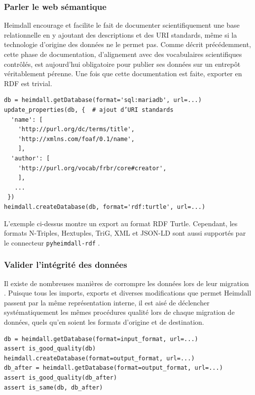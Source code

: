 \documentclass[final,fra]{anthology-ch}         %
\begin{document}
\subsubsection{Parler le web sémantique}\label{parler-le-web-suxe9mantique}

Heimdall encourage et facilite le fait de documenter scientifiquement une base relationnelle en y ajoutant des descriptions et des URI standards, même si la technologie d'origine des données ne le permet pas. Comme décrit précédemment, cette phase de documentation, d'alignement avec des vocabulaires scientifiques contrôlés, est aujourd'hui obligatoire pour publier ses données sur un entrepôt véritablement pérenne. Une fois que cette documentation est faite, exporter en RDF est trivial.

\begin{verbatim}
db = heimdall.getDatabase(format='sql:mariadb', url=...)
update_properties(db, {  # ajout d’URI standards
  'name': [
    'http://purl.org/dc/terms/title',
    'http://xmlns.com/foaf/0.1/name',
    ],
  'author': [
    'http://purl.org/vocab/frbr/core#creator',
    ],
   ...
 })
heimdall.createDatabase(db, format='rdf:turtle', url=...)
\end{verbatim}

L'exemple ci-dessus montre un export au format RDF Turtle. Cependant, les formats N-Triples, Hextuples, TriG, XML et JSON-LD sont aussi supportés par le connecteur \texttt{pyheimdall-rdf} \autocite{pyheimdall-rdf}.

\subsubsection{Valider l'intégrité des données}\label{valider-lintuxe9grituxe9-des-donnuxe9es}

Il existe de nombreuses manières de corrompre les données lors de leur migration \autocite{meliekthehobbitreferences}. Puisque tous les imports, exports et diverses modifications que permet Heimdall passent par la même représentation interne, il est aisé de déclencher systématiquement les mêmes procédures qualité lors de chaque migration de données, quels qu'en soient les formats d'origine et de destination.

\begin{verbatim}
db = heimdall.getDatabase(format=input_format, url=...)
assert is_good_quality(db)
heimdall.createDatabase(format=output_format, url=...)
db_after = heimdall.getDatabase(format=output_format, url=...)
assert is_good_quality(db_after)
assert is_same(db, db_after)
\end{verbatim}
\end{document}
